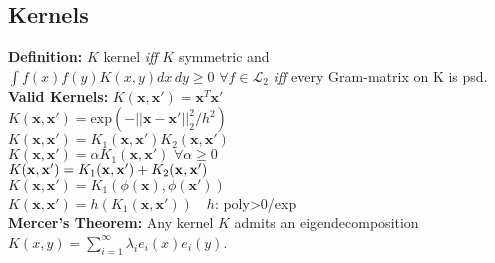 \subsection*{Kernels}
\textbf{Definition:} $K$ kernel \emph{iff} $K$ symmetric and $\int f(x)f(y)K(x,y)dx\,dy \geq 0\,\,\forall f\in\mathcal{L}_2$ \emph{iff} every Gram-matrix on K is psd.\\
\textbf{Valid Kernels:}
$K(\mathbf{x},\mathbf{x'}){=}\mathbf{x}^T\mathbf{x'}$\\
$K(\mathbf{x},\mathbf{x'}){=}\mathrm{exp}(-||\mathbf{x}{-}\mathbf{x'}||_2^2/h^2)$\\
$K(\mathbf{x}, \mathbf{x'})=K_1(\mathbf{x}, \mathbf{x'})K_2(\mathbf{x}, \mathbf{x'})$\\
$K(\mathbf{x},\mathbf{x'})=\alpha K_1(\mathbf{x}, \mathbf{x'})\,\,\forall \alpha\geq0$\\
$K({\mathbf{x}}, {\mathbf{x}}') = K_1({\mathbf{x}}, {\mathbf{x}}') + K_2({\mathbf{x}}, {\mathbf{x}}')$\\
$K(\mathbf{x},\mathbf{x'}){=}K_1(\phi(\mathbf{x}), \phi(\mathbf{x'}))\quad$\\
$K(\mathbf{x},\mathbf{x'}){=}h(K_1(\mathbf{x}, \mathbf{x'}))\quad h$: poly>0/exp\\
\textbf{Mercer's Theorem:} Any kernel $K$ admits an eigendecomposition $K(x,y) = \sum_{i=1}^\infty \lambda_i e_i(x)e_i(y)$.